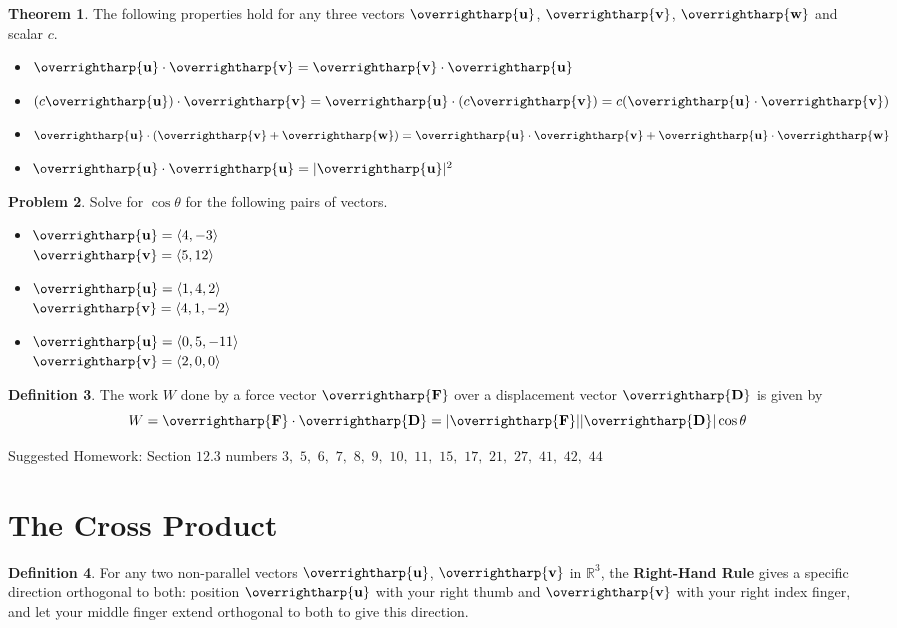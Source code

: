 \documentclass[letterpaper, twoside, 12pt]{book}
\newcommand{\<}{\langle}
\renewcommand{\>}{\rangle}
\theoremstyle{definition}
\newtheorem{theorem}{Theorem}
\theoremstyle{definition}
\newtheorem{definition}[theorem]{Definition}
\newtheorem{problem}[theorem]{Problem}
\newcommand{\harpvec}[1]{\overrightharp{\ensuremath{\mathbf{#1}}}}
\begin{document}
\begin{theorem}
The following properties hold for any three vectors $\harpvec{u}$, $\harpvec{v}$,
$\harpvec{w}$ and scalar $c$.
  \begin{itemize}
  \item $\harpvec{u} \cdot \harpvec{v} = \harpvec{v}\cdot\harpvec{u}$
  \item $(c\harpvec{u})\cdot \harpvec{v} = \harpvec{u} \cdot (c\harpvec{v}) = c(\harpvec{u} \cdot \harpvec{v})$
  \item $\harpvec{u} \cdot (\harpvec{v} + \harpvec{w}) = \harpvec{u}\cdot\harpvec{v} + \harpvec{u}\cdot \harpvec{w}$
  \item $\harpvec{u} \cdot \harpvec{u} = |\harpvec{u}|^2$
  \end{itemize}
\end{theorem}

\begin{problem}
  Solve for $\cos\theta$ for the following pairs of vectors.
  \begin{itemize}
    \item $\harpvec{u}=\<4,-3\>$\\ $\harpvec{v}=\<5,12\>$
    \item $\harpvec{u}=\<1,4,2\>$\\ $\harpvec{v}=\<4,1,-2\>$
    \item $\harpvec{u}=\<0,5,-11\>$\\ $\harpvec{v}=\<2,0,0\>$
  \end{itemize}
\end{problem}

\vfill

\begin{definition}
  The work $W$ done by a force vector $\harpvec{F}$ over a displacement
  vector $\harpvec{D}$ is given by
  \[
    W = \harpvec{F} \cdot \harpvec{D}
      =
    |\harpvec{F}||\harpvec{D}|\cos \theta
  \]
\end{definition}

\noindent Suggested Homework: Section $12.3$ numbers
$3,$ $5,$ $6,$ $7,$ $8,$ $9,$ $10,$ $11,$ $15,$ $17,$ $21,$ $27,$ $41,$ $42,$ $44$


\newpage


\section{The Cross Product}

  \begin{definition}
    For any two non-parallel vectors $\harpvec{u}$, $\harpvec{v}$ in $\mathbb R^3$,
    the \textbf{Right-Hand Rule} gives a specific direction orthogonal to both:
    position $\harpvec{u}$ with your right thumb and $\harpvec{v}$ with your
    right index finger, and let your middle finger extend orthogonal to both
    to give this direction.
  \end{definition}
\end{document}
